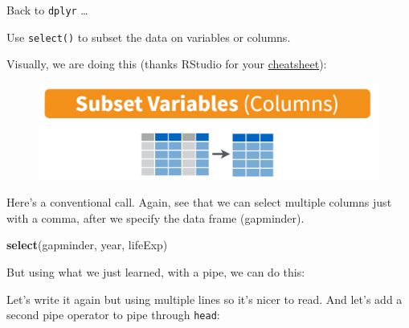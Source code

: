 \documentclass[]{book}
\newenvironment{Shaded}{\begin{snugshade}}{\end{snugshade}}
\newcommand{\KeywordTok}[1]{\textcolor[rgb]{0.13,0.29,0.53}{\textbf{#1}}}
\newcommand{\DecValTok}[1]{\textcolor[rgb]{0.00,0.00,0.81}{#1}}
\newcommand{\StringTok}[1]{\textcolor[rgb]{0.31,0.60,0.02}{#1}}
\newcommand{\OperatorTok}[1]{\textcolor[rgb]{0.81,0.36,0.00}{\textbf{#1}}}
\newcommand{\NormalTok}[1]{#1}
\theoremstyle{definition}
\theoremstyle{definition}
\theoremstyle{definition}
\theoremstyle{remark}
\begin{document}
Back to \texttt{dplyr} \ldots{}

Use \texttt{select()} to subset the data on variables or columns.

Visually, we are doing this (thanks RStudio for your
\href{http://www.rstudio.com/wp-content/uploads/2015/02/data-wrangling-cheatsheet.pdf}{cheatsheet}):

\begin{figure}
\centering
\includegraphics{img/rstudio-cheatsheet-select.png}
\caption{}
\end{figure}

Here's a conventional call. Again, see that we can select multiple
columns just with a comma, after we specify the data frame (gapminder).

\begin{Shaded}
\begin{Highlighting}[]
\KeywordTok{select}\NormalTok{(gapminder, year, lifeExp) }
\end{Highlighting}
\end{Shaded}

But using what we just learned, with a pipe, we can do this:

\begin{Shaded}
\end{Shaded}

Let's write it again but using multiple lines so it's nicer to read. And
let's add a second pipe operator to pipe through \texttt{head}:

\begin{Shaded}
\end{Shaded}
\end{document}
